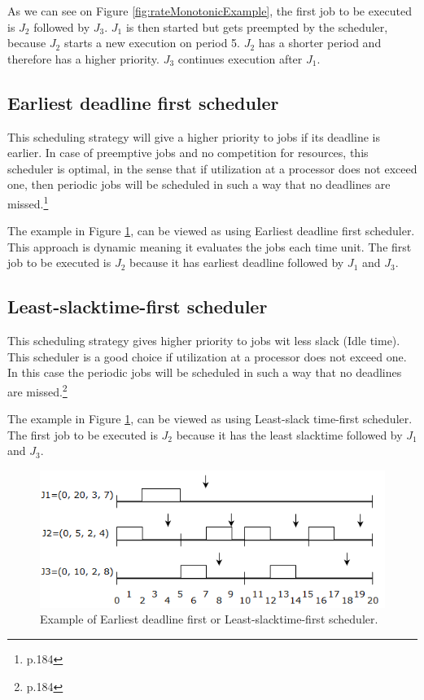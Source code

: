 As we can see on Figure \ref{fig:rateMonotonicExample}, the first job to be executed is $J_2$ followed by $J_3$. $J_1$ is then started but gets preempted by the scheduler, because $J_2$ starts a new execution on period 5. $J_2$ has a shorter period and therefore has a higher priority. $J_3$ continues execution after $J_1$.

\subsection{Earliest deadline first scheduler}
This scheduling strategy will give a higher priority to jobs if its deadline is
earlier. In case of preemptive jobs and no competition for resources, this scheduler
is optimal, in the sense that if utilization at a processor does not exceed one, then
periodic jobs will be scheduled in such a way that no deadlines are missed.\footnote{\cite{Fokkink1965} p.184}

The example in Figure \ref{fig:EarliestDeadlineFirstAndLeastSlacktimeFirstSchedulerExample}, can be viewed as using Earliest deadline first scheduler. This approach is dynamic meaning it evaluates the jobs each time unit. The first job to be executed is $J_2$ because it has earliest deadline followed by $J_1$ and $J_3$.

\subsection{Least-slacktime-first scheduler}
This scheduling strategy gives higher priority to jobs wit less slack (Idle time). This scheduler is a good choice if utilization at a processor does not exceed one. In this case the periodic jobs will be scheduled in such a way that no deadlines are missed.\footnote{\cite{Fokkink1965} p.184}

The example in Figure \ref{fig:EarliestDeadlineFirstAndLeastSlacktimeFirstSchedulerExample}, can be viewed as using Least-slack time-first scheduler. The first job to be executed is $J_2$ because it has the least slacktime followed by $J_1$ and $J_3$.

\begin{figure}[h!]\label{}
	\centering
	\includegraphics[scale=0.5]{realTimeComputing/fig/EarliestDeadlineFirst.png}
	\caption{Example of Earliest deadline first or Least-slacktime-first scheduler.}
	\label{fig:EarliestDeadlineFirstAndLeastSlacktimeFirstSchedulerExample}
\end{figure}

